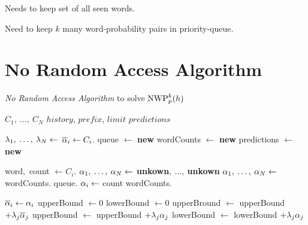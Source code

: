 
\begin{draft}
Needs to keep set of all seen words.

Need to keep $k$ many word-probability pairs in priority-queue.
\end{draft}

\section{No Random Access Algorithm}

\begin{algorithm}
  \caption{\emph{No Random Access Algorithm} to solve $\NWP[p][k]{h}$}
  \label{alg:norandomaccessalgorithm}
  \begin{algorithmic}[1]
    \Require $C_1, \: \ldots, \: C_N$
    \Require $history$, $prefix$, $limit$
    \Statex {}
    \Ensure $predictions$

    \State $\lambda_1, \: \ldots, \: \lambda_N \gets$ 
      \State $\overline{\alpha}_i \gets C_i$.
    \EndFor
    \State queue $\gets$ \textbf{new} 
    \State wordCounts $\gets$ \textbf{new} 
    \State predictions $\gets$ \textbf{new} 

    \vspace{0.7em}
      \State word$,$ count $\gets C_i$.
        \State $\alpha_1, \: \ldots, \: \alpha_N \gets $ \textbf{unkown}$, \: \ldots, \:$\textbf{unkown}
      \Else
        \State $\alpha_1, \: \ldots, \: \alpha_N \gets $ wordCounts.
        \State queue.
      \EndIf
      \State $\alpha_i \gets$ count
      \State wordCounts.

      \vspace{0.7em}
      \State $\overline{\alpha}_i \gets \alpha_i$
      \State upperBound $\gets 0$
      \State lowerBound $\gets 0$
          \State upperBround $\gets$ upperBound $+ \lambda_j \overline{\alpha}_j$
        \Else
          \State upperBound $\gets$ upperBound $+ \lambda_j \alpha_j$
          \State lowerBound $\gets$ lowerBound $+ \lambda_j \alpha_j$
        \EndIf
      \EndFor


\end{algorithmic}
\end{algorithm}
